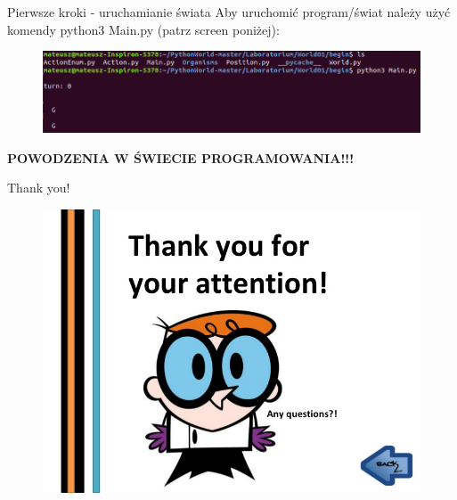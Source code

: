 \documentclass[10pt,ignorenonframetext,]{beamer}
\begin{document}
\begin{frame}{Pierwsze kroki - uruchamianie świata}
  Aby uruchomić program/świat należy użyć komendy python3 Main.py (patrz screen poniżej): 
        \begin{figure}[!h]
  	\centering
  	\includegraphics[scale=0.35]{pictures/runworld.png}
  \end{figure}
\begin{center}
	\textbf{POWODZENIA W ŚWIECIE PROGRAMOWANIA!!!}
\end{center}

\end{frame}

\begin{frame}{Thank you!}
\begin{figure}[!h]
	\begin{center}
		\includegraphics[scale=0.4]{pictures/thank.jpg}
	\end{center}
\end{figure}
\end{frame}
\end{document}
